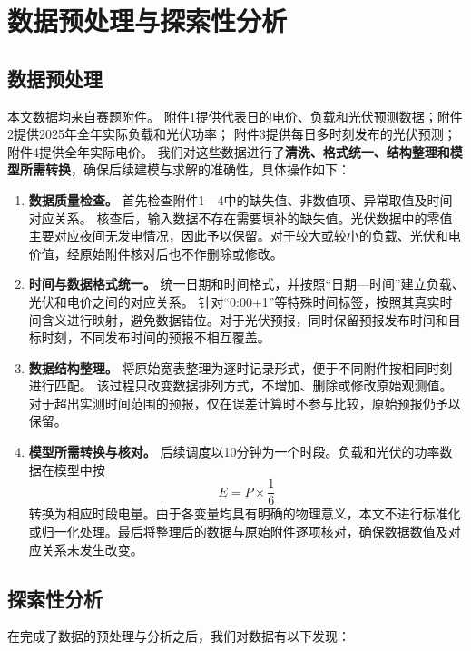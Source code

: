 \section{数据预处理与探索性分析}

\subsection{数据预处理}
本文数据均来自赛题附件。
附件1提供代表日的电价、负载和光伏预测数据；附件2提供2025年全年实际负载和光伏功率；
附件3提供每日多时刻发布的光伏预测；附件4提供全年实际电价。
我们对这些数据进行了\textbf{清洗、格式统一、结构整理和模型所需转换}，确保后续建模与求解的准确性，具体操作如下：

\begin{enumerate}
\item \textbf{数据质量检查。}
首先检查附件1—4中的缺失值、非数值项、异常取值及时间对应关系。
核查后，输入数据不存在需要填补的缺失值。光伏数据中的零值主要对应夜间无发电情况，因此予以保留。对于较大或较小的负载、光伏和电价值，经原始附件核对后也不作删除或修改。

\item \textbf{时间与数据格式统一。}
统一日期和时间格式，并按照“日期—时间”建立负载、光伏和电价之间的对应关系。
针对“0:00+1”等特殊时间标签，按照其真实时间含义进行映射，避免数据错位。对于光伏预报，同时保留预报发布时间和目标时刻，不同发布时间的预报不相互覆盖。

\item \textbf{数据结构整理。}
将原始宽表整理为逐时记录形式，便于不同附件按相同时刻进行匹配。
该过程只改变数据排列方式，不增加、删除或修改原始观测值。对于超出实测时间范围的预报，仅在误差计算时不参与比较，原始预报仍予以保留。

\item \textbf{模型所需转换与核对。}
后续调度以10分钟为一个时段。负载和光伏的功率数据在模型中按
\begin{equation}
E = P \times \frac{1}{6}
\end{equation}
转换为相应时段电量。由于各变量均具有明确的物理意义，本文不进行标准化或归一化处理。最后将整理后的数据与原始附件逐项核对，确保数据数值及对应关系未发生改变。
\end{enumerate}


\subsection{探索性分析}
在完成了数据的预处理与分析之后，我们对数据有以下发现：


